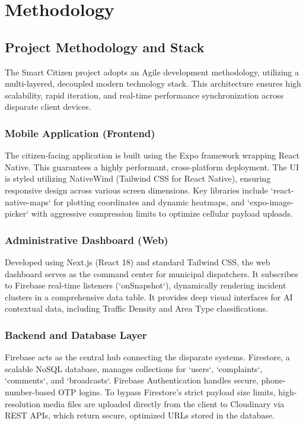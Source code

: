 \documentclass[12pt,a4paper]{report}
\begin{document}
\chapter{Methodology}
\section{Project Methodology and Stack}
The Smart Citizen project adopts an Agile development methodology, utilizing a multi-layered, decoupled modern technology stack. This architecture ensures high scalability, rapid iteration, and real-time performance synchronization across disparate client devices.

\subsection{Mobile Application (Frontend)}
The citizen-facing application is built using the Expo framework wrapping React Native. This guarantees a highly performant, cross-platform deployment. The UI is styled utilizing NativeWind (Tailwind CSS for React Native), ensuring responsive design across various screen dimensions. Key libraries include `react-native-maps` for plotting coordinates and dynamic heatmaps, and `expo-image-picker` with aggressive compression limits to optimize cellular payload uploads.

\subsection{Administrative Dashboard (Web)}
Developed using Next.js (React 18) and standard Tailwind CSS, the web dashboard serves as the command center for municipal dispatchers. It subscribes to Firebase real-time listeners (`onSnapshot`), dynamically rendering incident clusters in a comprehensive data table. It provides deep visual interfaces for AI contextual data, including Traffic Density and Area Type classifications.

\subsection{Backend and Database Layer}
Firebase acts as the central hub connecting the disparate systems. Firestore, a scalable NoSQL database, manages collections for `users`, `complaints`, `comments`, and `broadcasts`. Firebase Authentication handles secure, phone-number-based OTP logins. To bypass Firestore's strict payload size limits, high-resolution media files are uploaded directly from the client to Cloudinary via REST APIs, which return secure, optimized URLs stored in the database.
\end{document}
